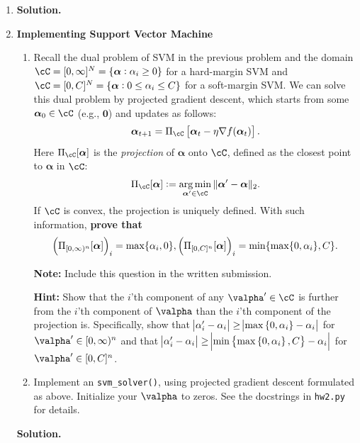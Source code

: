 \documentclass{article}
\def\balpha{\boldsymbol{\alpha}}
\DeclareMathOperator*{\argmin}{arg\,min}
\theoremstyle{definition}
\theoremstyle{remark}
\newenvironment{Q}
{%
\clearpage
\item
}
{%
\phantom{s} %
\bigskip
\textbf{Solution.}
}
\begin{document}
\begin{enumerate}[font={\Large\bfseries},left=0pt]
\begin{Q}
\begin{enumerate}
\begin{enumerate}
        \end{enumerate}
    \end{enumerate}
\end{Q}
    
    \begin{tcolorbox}

    \end{tcolorbox}
    
    \begin{Q}
    \textbf{\Large Implementing Support Vector Machine}

    \begin{enumerate}
        \item Recall the dual problem of SVM in the previous problem and the domain $\cC=[0, \infty]^N=\{\balpha:\alpha_i\ge0\}$ for a hard-margin SVM and $\cC=[0,C]^N=\{\balpha:0\le\alpha_i\le C\}$ for a soft-margin SVM. We can solve this dual problem by projected gradient descent, which starts from some $\balpha_0\in\cC$ (e.g., $\boldsymbol{0}$) and updates as follows:
        \begin{align*}
            \balpha_{t+1}=\Pi_{\cC}\sbr{\balpha_t-\eta\nabla f(\balpha_t)}.
        \end{align*}
        Here $\Pi_{\cC}[\balpha]$ is the \emph{projection} of $\balpha$ onto $\cC$, defined as the closest point to $\balpha$ in $\cC$:
        \begin{align*}
            \Pi_{\cC}[\balpha]:=\argmin_{\balpha'\in\cC}\|\balpha'-\balpha\|_2.
        \end{align*}
        If $\cC$ is convex, the projection is uniquely defined.
        With such information, \textbf{prove that}
        \begin{align*}
            \del{\Pi_{[0,\infty)^n}[\balpha]}_i=\max\{\alpha_i,0\}, \del{\Pi_{[0,C]^n}[\balpha]}_i=\min\{\max\{0,\alpha_i\},C\}.
        \end{align*}
        
        \textbf{Note:} Include this question in the written submission.

        \textbf{Hint:} Show that the $i$'th component of any $\valpha' \in \cC$ is further from the $i$'th component of $\valpha$ than the $i$'th component of the projection is. Specifically, show that $\abs{\alpha'_i - \alpha_i} \ge \abs{\max\cbr{0, \alpha_i} - \alpha_i}$ for $\valpha' \in [0,\infty)^n$ and that $\abs{\alpha'_i - \alpha_i} \ge \abs{\min\cbr{\max\cbr{0, \alpha_i}, C} - \alpha_i}$ for $\valpha' \in [0,C]^n$.
        \item Implement an \texttt{svm\_solver()}, using projected gradient descent formulated as above. Initialize your $\valpha$ to zeros. See the docstrings in \texttt{hw2.py} for details.
        

\end{enumerate}
\end{Q}
\end{enumerate}
\end{document}
